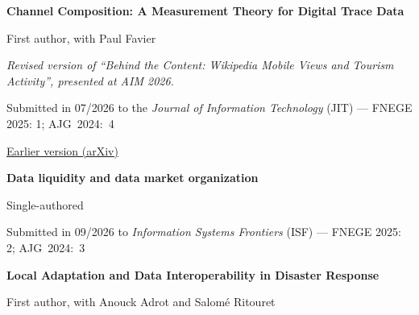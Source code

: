 \documentclass[11pt,a4paper]{article}
\newlength{\cvindent}
\newenvironment{cvblock}[1][1]{%
  \par\noindent\hspace*{#1\cvindent}%
  \begin{minipage}{\dimexpr\linewidth-#1\cvindent\relax}%
}{%
  \end{minipage}\par
}
\newenvironment{cvdetails}{%
  \begin{list}{}{%
    \setlength{\leftmargin}{\cvindent}%
    \setlength{\rightmargin}{0pt}%
    \setlength{\topsep}{0.1em}%
    \setlength{\partopsep}{0pt}%
    \setlength{\parsep}{0.05em}%
    \setlength{\itemsep}{0pt}%
  }\item[]\small\ignorespaces
}{%
  \end{list}
}
\begin{document}
\begin{cvblock}[2]
\textbf{Channel Composition: A Measurement Theory for Digital Trace Data}\par
\begin{cvdetails}
{\small First author, with Paul Favier}\par
\vspace{0.3em}
{\small\itshape Revised version of “Behind the Content: Wikipedia Mobile Views and Tourism Activity”, presented at AIM 2026.}\par
{\small Submitted in 07/2026 to the \textit{Journal of Information Technology} (JIT) --- FNEGE 2025: 1; \mbox{AJG 2024: 4}}\par
\href{https://arxiv.org/abs/2606.29991}{Earlier version (arXiv)}\par
\end{cvdetails}
\end{cvblock}\par\vspace{0.35em}

\begin{cvblock}[2]
\textbf{Data liquidity and data market organization}\par
\begin{cvdetails}
{\small Single-authored}\par
{\small Submitted in 09/2026 to \textit{Information Systems Frontiers} (ISF) --- FNEGE 2025: 2; \mbox{AJG 2024: 3}}\par
\end{cvdetails}
\end{cvblock}\par\vspace{0.35em}

\begin{cvblock}[2]
\textbf{Local Adaptation and Data Interoperability in Disaster Response}\par
\begin{cvdetails}
{\small First author, with Anouck Adrot and Salomé Ritouret}\par
\end{cvdetails}
\end{cvblock}\par\vspace{0.35em}
\end{document}
